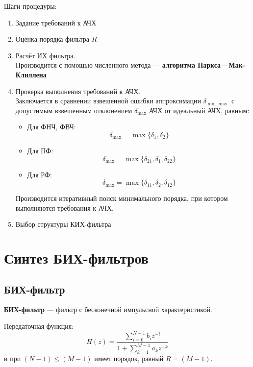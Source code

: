 \documentclass[a4paper, 14pt]{extarticle}
\begin{document}
Шаги процедуры:
\begin{enumerate}
    \item Задание требований к АЧХ
    \item Оценка порядка фильтра $R$
    \item Расчёт ИХ фильтра.\\
        Производится с помощью численного метода --- \textbf{алгоритма Паркса---Мак-Клиллена}
    \item Проверка выполнения требований к АЧХ.\\
        Заключается в сравнении взвешенной ошибки аппроксимации $\delta_{\min\max}$ с допустимым взвешенным отклонением $\delta_{\max}$ АЧХ от идеальный АЧХ, равным:
        \begin{itemize}
            \item Для ФНЧ, ФВЧ:
                \begin{equation}
                    \delta_{\max} = \max\{\delta_1, \delta_2\}
                \end{equation}
            \item Для ПФ:
                \begin{equation}
                    \delta_{\max} = \max\{\delta_{21}, \delta_{1}, \delta_{22}\}
                \end{equation}
            \item Для РФ:
                \begin{equation}
                    \delta_{\max} = \max\{\delta_{11}, \delta_{2}, \delta_{12}\}
                \end{equation}
        \end{itemize}
        Производится итеративный поиск минимального порядка, при котором выполняются требования к АЧХ.
    \item Выбор структуры КИХ-фильтра
\end{enumerate}

\section{Синтез БИХ-фильтров}
\subsection{БИХ-фильтр}
\textbf{БИХ-фильтр} --- фильтр с бесконечной импульсной характеристикой.

Передаточная функция:
\begin{equation}
    H(z) = \frac{ \sum^{N-1}_{i=0} b_i z^{-i} }{1 + \sum^{M-1}_{k=1} a_k z^{-k}}
\end{equation}
и при $(N-1) \le (M-1)$ имеет порядок, равный $R = (M-1)$.
\end{document}
